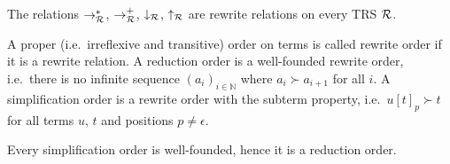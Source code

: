 \begin{lemma}
	The relations $\rightarrow^*_{\mathcal R}$,
	$\rightarrow^+_{\mathcal R}$,
	$\downarrow_{\mathcal R}$, $\uparrow_{\mathcal R}$ are rewrite relations on every TRS ${\mathcal R}$.
\end{lemma}
\begin{definition}
	A proper (i.e.~irreflexive and transitive) order on terms is called {\myem rewrite order} if it is a rewrite relation.
	A {\myem reduction order} is a well-founded rewrite order,
	i.e.~there is no infinite sequence
	$(a_i)_{i\in\mathbb{N}}$
	where $a_i\succ a_{i+1}$ for all $i$.
	A {\myem simplification order} is a rewrite order with the {\myem subterm property},
	i.e.~$u[t]_p \succ t$ for all terms $u$, $t$ and positions $p\neq\epsilon$.
\end{definition}
\begin{lemma}
	Every simplification order is well-founded, hence it is a reduction order.
\end{lemma}





